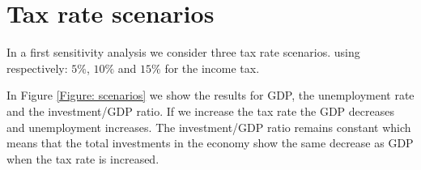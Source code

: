 \section{Tax rate scenarios}
In a first sensitivity analysis we consider three tax rate scenarios. using respectively: $5\%$, $10\%$ and $15\%$ for the income tax.

In Figure \ref{Figure: scenarios} we show the results for GDP, the unemployment rate and the investment/GDP ratio.
If we increase the tax rate the GDP decreases and unemployment increases. The investment/GDP ratio remains constant which means that the total investments in the economy show the same decrease as GDP when the tax rate is increased.






